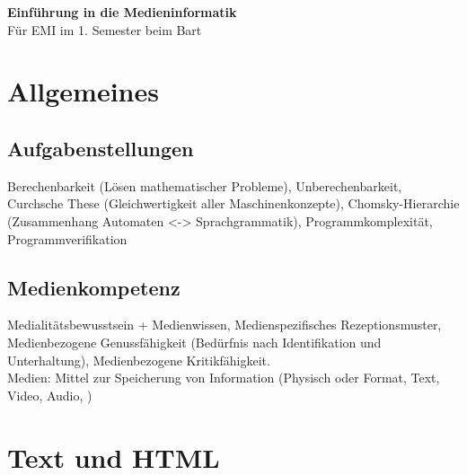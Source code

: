 \documentclass[12pt,landscape]{article}
\begin{document}
\footnotesize
\begin{multicols}{3}

\begin{center}
     \Large{\textbf{Einführung in die Medieninformatik}} \\
     \small{Für EMI im 1. Semester beim Bart}
\end{center}

\section{Allgemeines}
\subsection{Aufgabenstellungen}
Berechenbarkeit (Lösen mathematischer Probleme), Unberechenbarkeit, Curchsche These (Gleichwertigkeit aller Maschinenkonzepte), Chomsky-Hierarchie (Zusammenhang Automaten <-> Sprachgrammatik), Programmkomplexität, Programmverifikation
\subsection{Medienkompetenz}
Medialitätsbewusstsein + Medienwissen, Medienspezifisches Rezeptionsmuster, Medienbezogene Genussfähigkeit (Bedürfnis nach Identifikation und Unterhaltung), Medienbezogene Kritikfähigkeit.\\
Medien: Mittel zur Speicherung von Information (Physisch oder Format, Text, Video, Audio, )
\section{Text und HTML}

\end{multicols}
\end{document}
